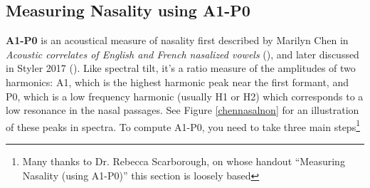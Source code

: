 \documentclass[11pt]{article}
\begin{document}
\hypertarget{measuring-nasality-using-a1-p0}{%
\subsection{Measuring Nasality using
A1-P0}\label{measuring-nasality-using-a1-p0}}

\label{a1p0}

\textbf{A1-P0} is an acoustical measure of nasality first described by
Marilyn Chen in \emph{Acoustic correlates of English and French
nasalized vowels} (\cite{Chen:1997vr}), and later discussed in Styler
2017 (\cite{Styler:2017}). Like spectral tilt, it's a ratio measure of
the amplitudes of two harmonics: A1, which is the highest harmonic peak
near the first formant, and P0, which is a low frequency harmonic
(usually H1 or H2) which corresponds to a low resonance in the nasal
passages. See Figure \ref{chennasalnon} for an illustration of these
peaks in spectra. To compute A1-P0, you need to take three main
steps\footnote{Many thanks to Dr. Rebecca Scarborough, on whose handout “Measuring Nasality (using A1-P0)” this section is loosely based}
\end{document}
